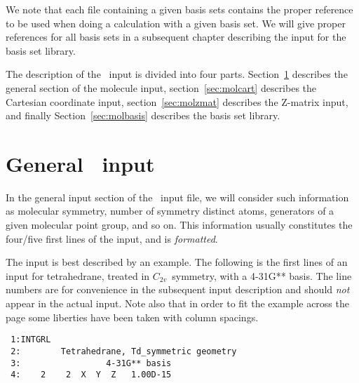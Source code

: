 We note that each file containing a given basis sets contains the
proper reference to be used when doing a calculation with a given
basis set. We will give proper references for all basis sets in a
subsequent chapter describing the input for the basis  set library.

The description of the \mol\ input is divided into four parts.
Section~\ref{sec:molgeneral} describes the general section of the
molecule input,
section~\ref{sec:molcart} describes the Cartesian coordinate
input,
section~\ref{sec:molzmat} describes the Z-matrix
input, and finally
Section~\ref{sec:molbasis} describes the basis set
library.

\section{General \mol\ input}\label{sec:molgeneral}

In the general input section of the \mol\ input file, we will consider
such information as molecular symmetry, number of
symmetry distinct atoms, generators of a
given molecular point group, and so on.
This information usually constitutes the four/five first lines of the
input, and is {\em formatted}.

The input is best described by an example.
The following is the first lines of an input for
tetrahedrane, treated in
$C_{2v}$~symmetry, with a 4-31G** basis.  The line numbers are for
convenience in the subsequent input description and should {\em
not} appear in the actual input.  Note also that in order to fit
the example across the page some liberties have been taken with
column spacings.
\begin{verbatim}
 1:INTGRL
 2:        Tetrahedrane, Td_symmetric geometry
 3:                 4-31G** basis
 4:    2    2  X  Y  Z   1.00D-15
\end{verbatim}

